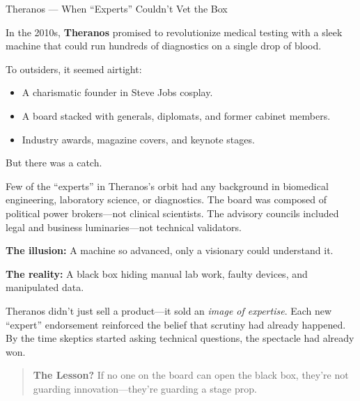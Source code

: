\begin{HistoricalSidebar}{Theranos — When “Experts” Couldn’t Vet the Box}

In the 2010s, \textbf{Theranos} promised to revolutionize medical testing with a sleek machine that could run hundreds of diagnostics on a single drop of blood.

\medskip 

To outsiders, it seemed airtight:  

\medskip 

\begin{itemize}
  \item A charismatic founder in Steve Jobs cosplay.
  \item A board stacked with generals, diplomats, and former cabinet members.
  \item Industry awards, magazine covers, and keynote stages.
\end{itemize}

\medskip 

But there was a catch.

\medskip 

Few of the “experts” in Theranos’s orbit had any background in biomedical engineering, laboratory science, 
or diagnostics.  The board was composed of political power brokers—not clinical scientists. The advisory 
councils included legal and business luminaries—not technical validators.

\medskip

\textbf{The illusion:} A machine so advanced, only a visionary could understand it.

\medskip

\textbf{The reality:} A black box hiding manual lab work, faulty devices, and manipulated data.

\medskip

Theranos didn’t just sell a product—it sold an \textit{image of expertise}.  Each new “expert” endorsement reinforced the belief that scrutiny had already happened.  By the time skeptics started asking technical questions, the spectacle had already won.

\medskip

\begin{quote}
\textbf{The Lesson?} If no one on the board can open the black box, they’re not guarding innovation—they’re guarding a stage prop.
\end{quote}

\end{HistoricalSidebar}

